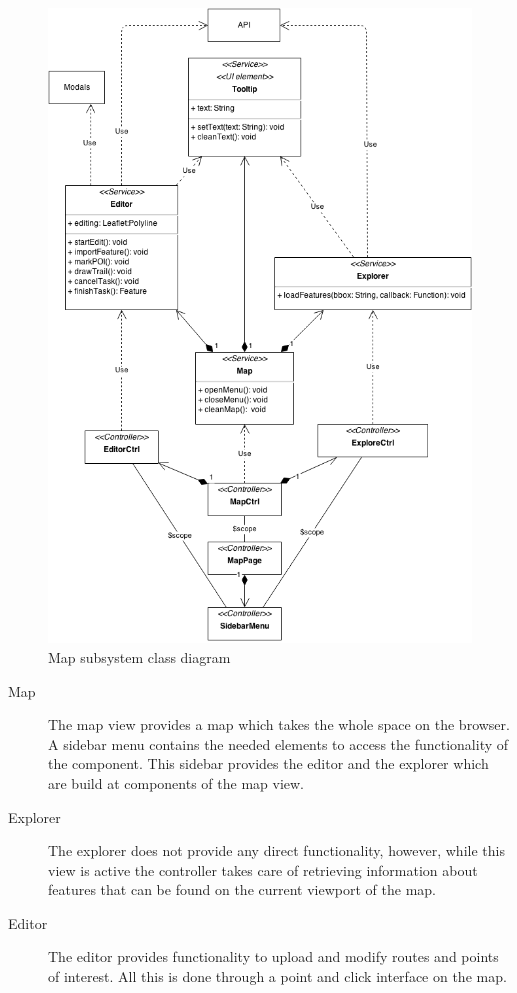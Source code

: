 \begin{figure}[ht]
  \centering
  \includegraphics[width=.75\textwidth]{fig/map-component}
  \caption{Map subsystem class diagram}
  \label{fig:map-component}
\end{figure}

\begin{description}
\item[Map] The map view provides a map which takes the whole space on the browser. A sidebar menu contains the needed elements to access the functionality of the component. This sidebar provides the editor and the explorer which are build at components of the map view.

\item[Explorer] The explorer does not provide any direct functionality, however, while this view is active the controller takes care of retrieving information about features that can be found on the current viewport of the map.

\item[Editor] The editor provides functionality to upload and modify routes and points of interest. All this is done through a point and click interface on the map.
\end{description}


